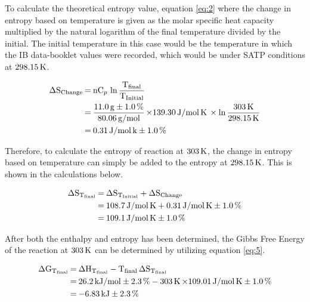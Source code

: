 \documentclass{article}
\begin{document}
\noindent
To calculate the theoretical entropy value, equation \ref{eq:2} where the change in entropy based on temperature is given as the molar specific heat capacity multiplied by the natural logarithm of the final temperature divided by the initial. The initial temperature in this case would be the temperature in which the IB data-booklet values were recorded, which would be under SATP conditions at $\ce{298.15K}$.
\begin{tcolorbox}[title=Calculation of Entropy Change from Temperature ($\ce{\Delta S_{Change}}$)]
\begin{equation}
    \begin{split}
        \ce{ 
        \Delta S_{Change} &= nC_p \ln \frac{T_{final}}{T_{Initial}} \\
        &= \frac{11.0 g \pm 1.0\%}{80.06 g/mol} \times} \ce{139.30 J/mol K \times \ln \frac{303K}{298.15K} \\
        &= 0.31 J/mol k \pm 1.0\%
        }
    \end{split}
\end{equation}
\end{tcolorbox}

\noindent
Therefore, to calculate the entropy of reaction at $\ce{303K}$, the change in entropy based on temperature can simply be added to the entropy at $\ce{298.15K}$. This is shown in the calculations below.

\begin{tcolorbox}[title=Calculation of Entropy of Reaction at $\ce{303K}$ ($\ce{\Delta S_{T_{final}}})$]
\begin{equation}
    \begin{split}
        \ce{
        \Delta S_{T_{final}} &= \Delta S_{T_{Initial}} + \Delta S_{Change} \\
        &= 108.7 J/mol K + 0.31 J/mol K \pm 1.0\% \\
        &= 109.1 J/mol K \pm 1.0\%
        }
    \end{split}
\end{equation}
\end{tcolorbox}

\noindent
After both the enthalpy and entropy has been determined, the Gibbs Free Energy of the reaction at $\ce{303K}$ can be determined by utilizing equation \ref{eq:5}.

\begin{tcolorbox}[title=Calculation of Gibbs Free Energy at $\ce{303K}$ ($\ce{\Delta G_{T_{final}}}$)]
\begin{equation}
    \begin{split}
        \ce{
        \Delta G_{T_{final}} &= \Delta H_{T_{final}} - T_{final} \Delta S_{T_{final}} \\
        &= 26.2 kJ/mol \pm 2.3\% - 303K \times} \ce{109.01 J/mol K \pm 1.0\% \\ 
        &= -6.83 \mathrm{kJ} \pm 2.3\%
        }
    \end{split}
\end{equation}
\end{tcolorbox}
\end{document}
